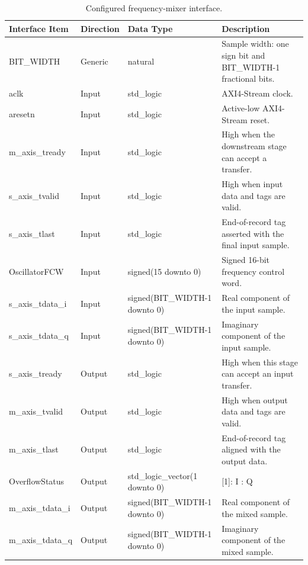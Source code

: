 \begin{table}[H]
\singlespacing
\small
\setlength{\tabcolsep}{2pt}
\renewcommand{\arraystretch}{0.95}
\begin{center}
\caption{Configured frequency-mixer interface.}
\begin{tabularx}{\textwidth}{|L{0.24\textwidth}|L{0.13\textwidth}|L{0.28\textwidth}|Y|}
\hline
\textbf{Interface Item} & \textbf{Direction} & \textbf{Data Type} & \textbf{Description} \\
\hline
BIT\_WIDTH         & Generic & natural & Sample width: one sign bit and BIT\_WIDTH-1 fractional bits. \\
\hline
aclk               & Input & std\_logic & AXI4-Stream clock. \\
\hline
aresetn            & Input & std\_logic & Active-low AXI4-Stream reset. \\
\hline
m\_axis\_tready    & Input & std\_logic & High when the downstream stage can accept a transfer. \\
\hline
s\_axis\_tvalid    & Input & std\_logic & High when input data and tags are valid. \\
\hline
s\_axis\_tlast     & Input & std\_logic & End-of-record tag asserted with the final input sample. \\
\hline
OscillatorFCW      & Input & signed(15 downto 0) & Signed 16-bit frequency control word. \\
\hline
s\_axis\_tdata\_i  & Input & signed(BIT\_WIDTH-1 \newline downto 0) & Real component of the input sample. \\
\hline
s\_axis\_tdata\_q  & Input & signed(BIT\_WIDTH-1 \newline downto 0) & Imaginary component of the input sample. \\
\hline
s\_axis\_tready    & Output & std\_logic & High when this stage can accept an input transfer. \\
\hline
m\_axis\_tvalid    & Output & std\_logic & High when output data and tags are valid. \\
\hline
m\_axis\_tlast     & Output & std\_logic & End-of-record tag aligned with the output data. \\
\hline
OverflowStatus     & Output & std\_logic\_vector(1 \newline downto 0) & [1]: I \newline [0]: Q \\
\hline
m\_axis\_tdata\_i  & Output & signed(BIT\_WIDTH-1 \newline downto 0) & Real component of the mixed sample. \\
\hline
m\_axis\_tdata\_q  & Output & signed(BIT\_WIDTH-1 \newline downto 0) & Imaginary component of the mixed sample. \\
\hline
\end{tabularx}
\end{center}
\end{table}

